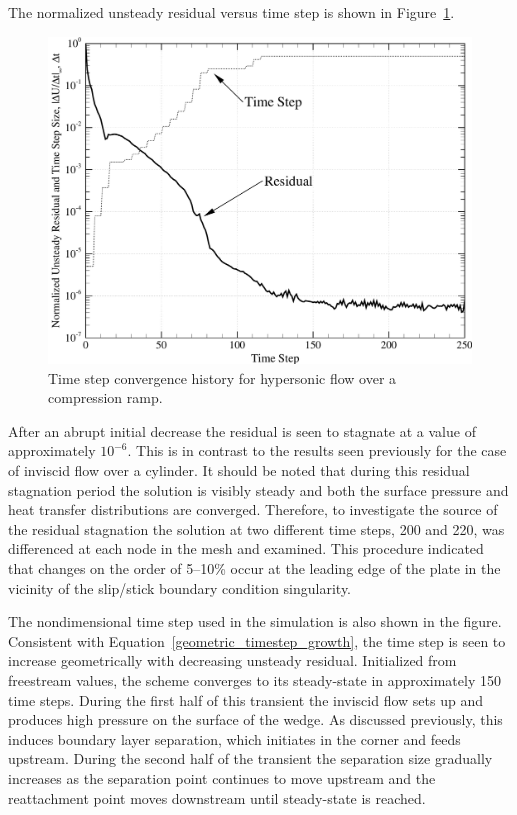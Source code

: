 The normalized unsteady residual versus time step is shown in Figure~\ref{fig:ramp_time_convergence}. 
\begin{figure}[hbtp]
  \begin{center}
    \includegraphics[width=\textwidth]{figures/holden_ramp/time_convergence}
    \caption{Time step convergence history for hypersonic flow over a compression ramp.\label{fig:ramp_time_convergence}}
  \end{center}
\end{figure}
 After an abrupt initial decrease the residual is seen to stagnate at a value of approximately $10^{-6}$.  This is in contrast to the results seen previously for the case of inviscid flow over a cylinder. It should be noted that during this residual stagnation period the solution is visibly steady and both the surface pressure and heat transfer distributions are converged.  Therefore, to investigate the source of the residual stagnation the solution at two different time steps, 200 and 220, was differenced at each node in the mesh and examined.  This procedure indicated that changes on the order of 5--10\% occur at the leading edge of the plate in the vicinity of the slip/stick boundary condition singularity.

The nondimensional time step used in the simulation is also shown in the figure.  Consistent with Equation~\eqref{geometric_timestep_growth}, the time step is seen to increase geometrically with decreasing unsteady residual. Initialized from freestream values, the scheme converges to its steady-state in approximately 150 time steps.  During the first half of this transient the inviscid flow sets up and produces high pressure on the surface of the wedge.  As discussed previously, this induces boundary layer separation, which initiates in the corner and feeds upstream.  During the second half of the transient the separation size gradually increases as the separation point continues to move upstream and the reattachment point moves downstream until steady-state is reached.

